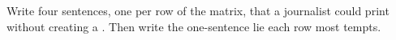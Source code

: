 \begin{exercise}
Write four sentences, one per row of the matrix, that a journalist could
print without creating a .
Then write the one-sentence lie each row most tempts.
\end{exercise}

